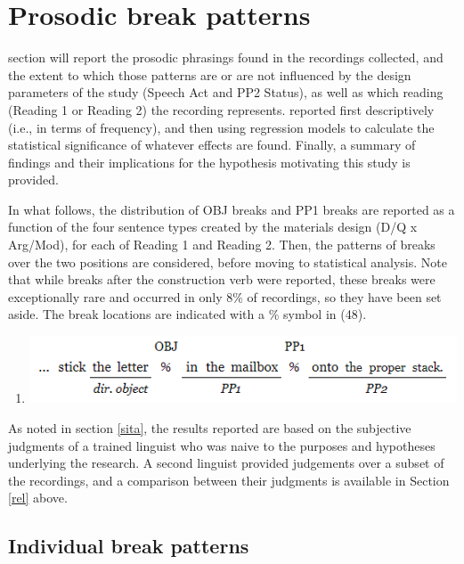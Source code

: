 \documentclass[12pt,oneside]{book}
\providecommand{\tightlist}{%
  \setlength{\itemsep}{0pt}\setlength{\parskip}{0pt}}
\begin{document}
\hypertarget{results-prosody}{%
\section{Prosodic break patterns}\label{results-prosody}}

 section will report the prosodic phrasings found in the recordings collected, and the extent to which those patterns are or are not influenced by the design parameters of the study (Speech Act and PP2 Status), as well as which reading (Reading 1 or Reading 2) the recording represents.  reported first descriptively (i.e., in terms of frequency), and then using regression models to calculate the statistical significance of whatever effects are found. Finally, a summary of findings and their implications for the hypothesis motivating this study is provided.

In what follows, the distribution of OBJ breaks and PP1 breaks are reported as a function of the four sentence types created by the materials design (D/Q x Arg/Mod), for each of Reading 1 and Reading 2. Then, the patterns of breaks over the two positions are considered, before moving to statistical analysis. Note that while breaks after the  construction verb were reported, these breaks were exceptionally rare and occurred in only 8\% of recordings, so they have been set aside. The break locations are indicated with a \% symbol in (48).

\begin{enumerate}
\def\labelenumi{(\arabic{enumi})}
\setcounter{enumi}{47}
\tightlist
\item
  \includegraphics{breakpos.png}
\end{enumerate}

As noted in section \ref{sita}, the results reported are based on the subjective judgments of a trained linguist who was naive to the purposes and hypotheses underlying the research. A second linguist provided judgements over a subset of the recordings, and a comparison between their judgments is available in Section \ref{rel} above.

\hypertarget{individual-break-patterns}{%
\subsection{Individual break patterns}\label{individual-break-patterns}}
\end{document}
